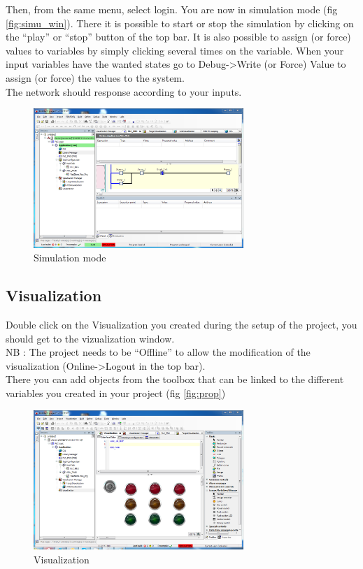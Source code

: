 \documentclass[10pt,a4paper]{article}
\begin{document}
Then, from the same menu, select login. You are now in simulation mode (fig \vref{fig:simu_win}).
There it is possible to start or stop the simulation by clicking on the ``play'' or ``stop'' button of the top bar.
It is also possible to assign (or force) values to variables by simply clicking several times on the variable. When your input variables have the wanted states go to Debug->Write (or Force) Value to assign (or force) the values to the system.\\
The network should response according to your inputs.

\begin{figure}[h!]
	\begin{center}
		\includegraphics[width=300px]{img10.PNG}
	\end{center}
\caption{Simulation mode}
\label{fig:simu_win}
\end{figure}

\subsection{Visualization}

Double click on the Visualization you created during the setup of the project, you should get to the vizualization window.\\
NB : The project needs to be ``Offline'' to allow the modification of the visualization (Online->Logout in the top bar).\\
There you can add objects from the toolbox that can be linked to the different variables you created in your project (fig \vref{fig:prop})

\begin{figure}[h!]
	\begin{center}
		\includegraphics[width=300px]{img11.PNG}
	\end{center}
\caption{Visualization}
\label{fig:visu}
\end{figure}
\end{document}
